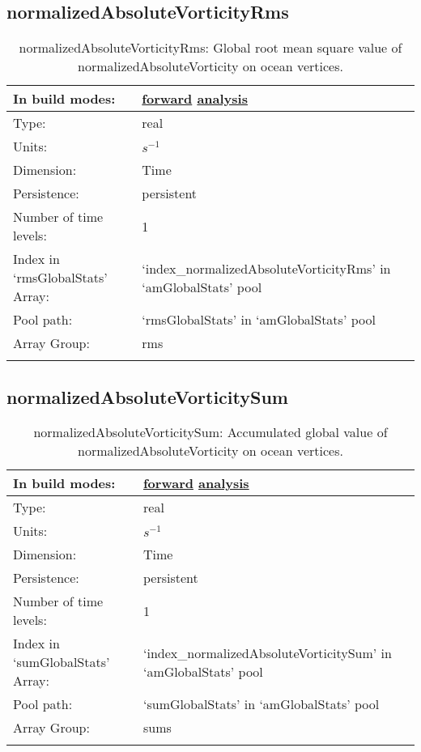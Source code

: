 \subsection[normalizedAbsoluteVorticityRms]{normalizedAbsoluteVorticityRms}
\label{subsec:var_sec_amGlobalStats_normalizedAbsoluteVorticityRms}
\begin{center}
\begin{longtable}{| p{2.0in} | p{4.0in} |}
        \hline 
        In build modes: & \hyperref[subsec:forward_var_tab_amGlobalStats]{forward} \hyperref[subsec:analysis_var_tab_amGlobalStats]{analysis} \\
        \hline 
        Type: & real \\
        \hline 
        Units: & $s^{-1}$ \\
        \hline 
        Dimension: & Time \\
        \hline 
        Persistence: & persistent \\
        \hline 
        Number of time levels: & 1 \\
        \hline 
		 Index in `rmsGlobalStats' Array: & `index\_normalizedAbsoluteVorticityRms' in `amGlobalStats' pool \\
		 \hline 
            Pool path: & `rmsGlobalStats' in `amGlobalStats' pool \\
		 \hline 
		 Array Group: & rms \\
		 \hline 
    \caption{normalizedAbsoluteVorticityRms: Global root mean square value of normalizedAbsoluteVorticity on ocean vertices.}
\end{longtable}
\end{center}
\subsection[normalizedAbsoluteVorticitySum]{normalizedAbsoluteVorticitySum}
\label{subsec:var_sec_amGlobalStats_normalizedAbsoluteVorticitySum}
\begin{center}
\begin{longtable}{| p{2.0in} | p{4.0in} |}
        \hline 
        In build modes: & \hyperref[subsec:forward_var_tab_amGlobalStats]{forward} \hyperref[subsec:analysis_var_tab_amGlobalStats]{analysis} \\
        \hline 
        Type: & real \\
        \hline 
        Units: & $s^{-1}$ \\
        \hline 
        Dimension: & Time \\
        \hline 
        Persistence: & persistent \\
        \hline 
        Number of time levels: & 1 \\
        \hline 
		 Index in `sumGlobalStats' Array: & `index\_normalizedAbsoluteVorticitySum' in `amGlobalStats' pool \\
		 \hline 
            Pool path: & `sumGlobalStats' in `amGlobalStats' pool \\
		 \hline 
		 Array Group: & sums \\
		 \hline 
    \caption{normalizedAbsoluteVorticitySum: Accumulated global value of normalizedAbsoluteVorticity on ocean vertices.}
\end{longtable}
\end{center}
